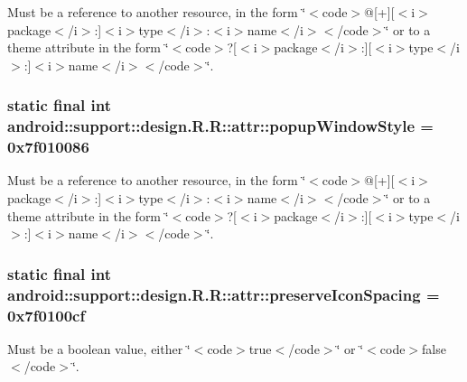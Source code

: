 Must be a reference to another resource, in the form \char`\"{}$<$code$>$@\mbox{[}+\mbox{]}\mbox{[}$<$i$>$package$<$/i$>$:\mbox{]}$<$i$>$type$<$/i$>$:$<$i$>$name$<$/i$>$$<$/code$>$\char`\"{} or to a theme attribute in the form \char`\"{}$<$code$>$?\mbox{[}$<$i$>$package$<$/i$>$:\mbox{]}\mbox{[}$<$i$>$type$<$/i$>$:\mbox{]}$<$i$>$name$<$/i$>$$<$/code$>$\char`\"{}. \hypertarget{classandroid_1_1support_1_1design_1_1_r_1_1attr_e981c46824e7c31b8cd57302d2d9d659}{
\subsubsection[{popupWindowStyle}]{\setlength{\rightskip}{0pt plus 5cm}static final int android::support::design.R.R::attr::popupWindowStyle = 0x7f010086}}
\label{classandroid_1_1support_1_1design_1_1_r_1_1attr_e981c46824e7c31b8cd57302d2d9d659}


Must be a reference to another resource, in the form \char`\"{}$<$code$>$@\mbox{[}+\mbox{]}\mbox{[}$<$i$>$package$<$/i$>$:\mbox{]}$<$i$>$type$<$/i$>$:$<$i$>$name$<$/i$>$$<$/code$>$\char`\"{} or to a theme attribute in the form \char`\"{}$<$code$>$?\mbox{[}$<$i$>$package$<$/i$>$:\mbox{]}\mbox{[}$<$i$>$type$<$/i$>$:\mbox{]}$<$i$>$name$<$/i$>$$<$/code$>$\char`\"{}. \hypertarget{classandroid_1_1support_1_1design_1_1_r_1_1attr_d32f6e72c9ec3f4ae61f12fb3263419b}{
\subsubsection[{preserveIconSpacing}]{\setlength{\rightskip}{0pt plus 5cm}static final int android::support::design.R.R::attr::preserveIconSpacing = 0x7f0100cf}}
\label{classandroid_1_1support_1_1design_1_1_r_1_1attr_d32f6e72c9ec3f4ae61f12fb3263419b}


Must be a boolean value, either \char`\"{}$<$code$>$true$<$/code$>$\char`\"{} or \char`\"{}$<$code$>$false$<$/code$>$\char`\"{}. 

